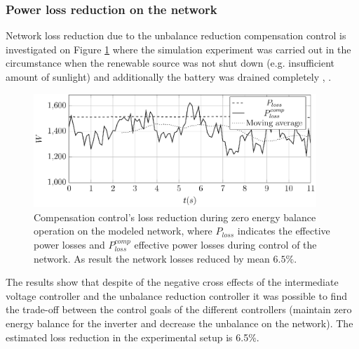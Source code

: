         \subsubsection{Power loss reduction on the network}\label{VUB:sec:Powerloss}

             Network loss reduction due to the unbalance reduction compensation control is investigated on Figure \ref{fig:compare_power} where the simulation experiment was carried out in the circumstance when the renewable source was not shut down (e.g. insufficient amount of sunlight) and additionally the battery was drained completely  \cite{Neukirchner2015}, \cite{neukirchner2015examination}.

            \begin{figure}[ht]
            \centering
            \includegraphics[width=0.95\textwidth]{Unblance_EPS_Pics/UnbalRedComp_JCP-figure6.eps}
            \caption{Compensation control's loss reduction during zero energy balance operation on the modeled network, where $P_{loss}$ indicates the effective power losses and $P^{comp}_{loss}$ effective power losses during control of the network. As result the network losses reduced by mean $6.5\%$.}
            \label{fig:compare_power}
            \end{figure}

            The results show that despite of the negative cross effects of the intermediate voltage controller and the unbalance reduction controller it was possible to find the trade-off between the control goals of the different controllers (maintain zero energy balance for the inverter and decrease the unbalance on the network). The estimated loss reduction in the experimental setup is 6.5\%.

